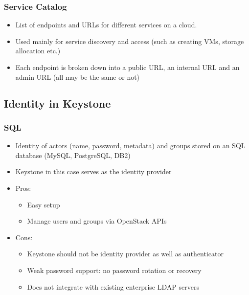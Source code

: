 \documentclass{article}
\begin{document}
\subsubsection{Service Catalog}
\begin{itemize}
    \item List of endpoints and URLs for different services on a cloud. 
    
    \item Used mainly for service discovery and access (such as creating VMs, storage allocation etc.)
    
    \item Each endpoint is broken down into a public URL, an internal URL and an admin URL (all may be the same or not)
\end{itemize}

\subsection{Identity in Keystone}
\subsubsection{SQL}
\begin{itemize}
    \item Identity of actors (name, password, metadata) and groups stored on an SQL database (MySQL, PostgreSQL, DB2) 
    
    \item Keystone in this case serves as the identity provider
    
    \item Pros:
    \begin{itemize}
        \item Easy setup
        
        \item Manage users and groups via OpenStack APIs
    \end{itemize}
    
    \item Cons:
    \begin{itemize}
        \item Keystone should not be identity provider as well as authenticator
        
        \item Weak password support: no password rotation or recovery
        
        \item Does not integrate with existing enterprise LDAP servers
    \end{itemize}
\end{itemize}
\end{document}
